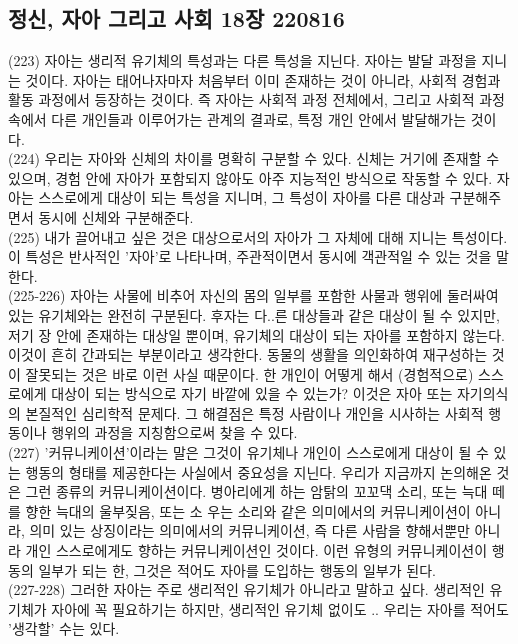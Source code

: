 \documentclass[12pt, a4paper]{article}
\begin{document}
\subsection{정신, 자아 그리고 사회 18장 220816}
(223) 자아는 생리적 유기체의 특성과는 다른 특성을 지닌다. 자아는 발달 과정을 지니는 것이다. 자아는 태어나자마자 처음부터 이미 존재하는 것이 아니라, 사회적 경험과 활동 과정에서 등장하는 것이다. 즉 자아는 사회적 과정 전체에서, 그리고 사회적 과정 속에서 다른 개인들과 이루어가는 관계의 결과로, 특정 개인 안에서 발달해가는 것이다. \\
(224) 우리는 자아와 신체의 차이를 명확히 구분할 수 있다. 신체는 거기에 존재할 수 있으며, 경험 안에 자아가 포함되지 않아도 아주 지능적인 방식으로 작동할 수 있다. 자아는 스스로에게 대상이 되는 특성을 지니며, 그 특성이 자아를 다른 대상과 구분해주면서 동시에 신체와 구분해준다. \\
(225) 내가 끌어내고 싶은 것은 대상으로서의 자아가 그 자체에 대해 지니는 특성이다. 이 특성은 반사적인 '자아'로 나타나며, 주관적이면서 동시에 객관적일 수 있는 것을 말한다. \\
(225-226) 자아는 사물에 비추어 자신의 몸의 일부를 포함한 사물과 행위에 둘러싸여 있는 유기체와는 완전히 구분된다. 후자는 다..른 대상들과 같은 대상이 될 수 있지만, 저기 장 안에 존재하는 대상일 뿐이며, 유기체의 대상이 되는 자아를 포함하지 않는다. 이것이 흔히 간과되는 부분이라고 생각한다. 동물의 생활을 의인화하여 재구성하는 것이 잘못되는 것은 바로 이런 사실 때문이다. 한 개인이 어떻게 해서 (경험적으로) 스스로에게 대상이 되는 방식으로 자기 바깥에 있을 수 있는가? 이것은 자아 또는 자기의식의 본질적인 심리학적 문제다. 그 해결점은 특정 사람이나 개인을 시사하는 사회적 행동이나 행위의 과정을 지칭함으로써 찾을 수 있다. \\
(227) '커뮤니케이션'이라는 말은 그것이 유기체나 개인이 스스로에게 대상이 될 수 있는 행동의 형태를 제공한다는 사실에서 중요성을 지닌다. 우리가 지금까지 논의해온 것은 그런 종류의 커뮤니케이션이다. 병아리에게 하는 암탉의 꼬꼬댁 소리, 또는 늑대 떼를 향한 늑대의 울부짖음, 또는 소 우는 소리와 같은 의미에서의 커뮤니케이션이 아니라, 의미 있는 상징이라는 의미에서의 커뮤니케이션, 즉 다른 사람을 향해서뿐만 아니라 개인 스스로에게도 향하는 커뮤니케이션인 것이다. 이런 유형의 커뮤니케이션이 행동의 일부가 되는 한, 그것은 적어도 자아를 도입하는 행동의 일부가 된다. \\
(227-228) 그러한 자아는 주로 생리적인 유기체가 아니라고 말하고 싶다. 생리적인 유기체가 자아에 꼭 필요하기는 하지만, 생리적인 유기체 없이도 .. 우리는 자아를 적어도 '생각할' 수는 있다.\\
\end{document}

